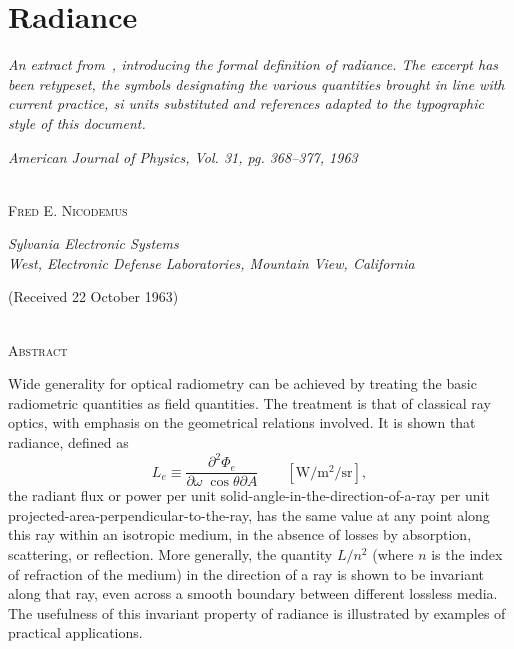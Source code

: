 \chapter{Radiance}
\label{ch:radiance}

\begin{center}
\begin{minipage}{\textwidth - 2em}
\itshape\small
An extract from~\cite{nicodemus63}, introducing the formal definition of
radiance. The excerpt has been retypeset, the symbols designating the various
quantities brought in line with current practice, \gls{si} units substituted and
references adapted to the typographic style of this document.
\end{minipage}
\end{center}

\begin{center}
\textit{\Large American Journal of Physics, Vol. 31, pg. 368--377, 1963}

{\Large \adfflourishleftdouble\quad{}\quad\adfflourishrightdouble}\\

\textsc{Fred E. Nicodemus}
\vspace{3pt}

\textit{\small Sylvania Electronic Systems\\
West, Electronic Defense Laboratories, Mountain View, California}

\vspace{3pt}
(Received 22 October 1963)

{\Large \adfclosedflourishleft\quad\adfclosedflourishright}\\

\textsc{Abstract}

\vspace{6pt}
\begin{minipage}{.786\textwidth}
\small
Wide generality for optical radiometry can be achieved by treating the basic radiometric
quantities as field quantities. The treatment is that of classical ray optics,
with
emphasis on the geometrical relations involved. It is shown that radiance,
defined as
\begin{displaymath}
L_e \equiv \frac{\partial^2 \Phi_e}{\partial\omega \; \cos\theta\partial A}
\qquad \left[\si{\watt\per\square\meter\per\steradian}\right],
\end{displaymath}
the radiant flux or power per unit solid-angle-in-the-direction-of-a-ray per
unit
projected-area-perpendicular-to-the-ray, has the same value at any point along this ray
within an isotropic medium, in the absence of losses by absorption, scattering, or
reflection. More generally, the quantity $L/n^2$ (where $n$ is the index of
refraction of
the medium) in the direction of a ray is shown to be invariant along that ray,
even across
a smooth boundary between different lossless media. The usefulness of this
invariant
property of radiance is illustrated by examples of practical applications.
\end{minipage}
\end{center}

